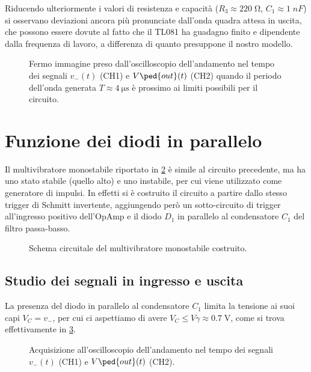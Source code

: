 \documentclass[10pt, a4paper, italian]{article}
\begin{document}
Riducendo ulteriormente i valori di resistenza e capacità
($R_3 \approx 220 \; \si{\ohm}$, $C_1 \approx 1 \; \si{nF}$) si osservano
deviazioni ancora più pronunciate dall'onda quadra attesa in uscita, che
possono essere dovute al fatto che il TL081 ha guadagno finito e dipendente
dalla frequenza di lavoro, a differenza di quanto presuppone il nostro modello. 
\begin{figure}[htbp]
	\centering
	\caption{Fermo immagine preso dall'oscilloscopio dell'andamento nel tempo dei
	segnali $v_- (t)$ (CH1) e $V\ped{out} (t)$ (CH2) quando il periodo dell'onda
	generata $T \approx \SI{4}{\micro\s}$ è prossimo ai limiti possibili per il
	circuito. \label{fig: astable_lim}}
\end{figure}

\section{Funzione dei diodi in parallelo}
Il multivibratore monostabile riportato in \cref{fig: mstableschm} è simile
al circuito precedente, ma ha uno stato stabile (quello alto) e uno instabile,
per cui viene utilizzato come generatore di impulsi. In effetti si è costruito
il circuito a partire dallo stesso trigger di Schmitt invertente, aggiungendo
però un sotto-circuito di trigger all'ingresso positivo dell'OpAmp e il diodo
$D_1$ in parallelo al condensatore $C_1$ del filtro passa-basso.
\begin{figure}[htbp]
    \centering
    \caption{Schema circuitale del multivibratore monostabile costruito.
    \label{fig: mstableschm}}
\end{figure}

\subsection{Studio dei segnali in ingresso e uscita}
La presenza del diodo in parallelo al condensatore $C_1$ limita la tensione
ai suoi capi $V_C = v_-$, per cui ci aspettiamo di avere
$V_C \leq V\gamma \approx 0.7 \; \si{\V}$, come si trova effettivamente in
\cref{fig: mstabilev-}.
\begin{figure}[htbp]
	\centering
	\caption{Acquisizione all'oscilloscopio dell'andamento nel tempo dei
	segnali $v_- (t)$ (CH1) e $V\ped{out} (t)$ (CH2). \label{fig: mstabilev-}}
\end{figure}
\end{document}
